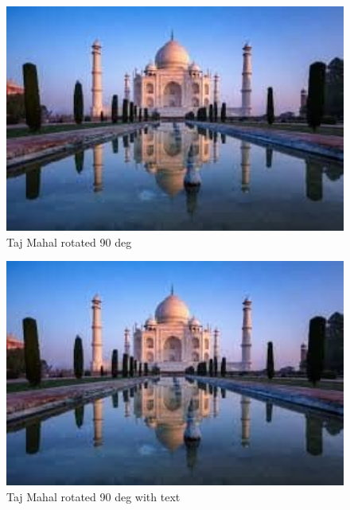 \documentclass{article}
\begin{document}
	\begin{figure}[h!]
		\centering
		\includegraphics[width=1\textwidth, angle=90]{images/taj.jpg}    %
		\caption{Taj Mahal rotated 90 deg}
		\label{tajrot90}
	\end{figure}

	\begin{figure}
		\centering
		\includegraphics[width=1\textwidth]{images/taj.jpg}    %
		\caption{Taj Mahal rotated 90 deg with text}
		\label{tajrot90_side}
	\end{figure}

\end{document}

